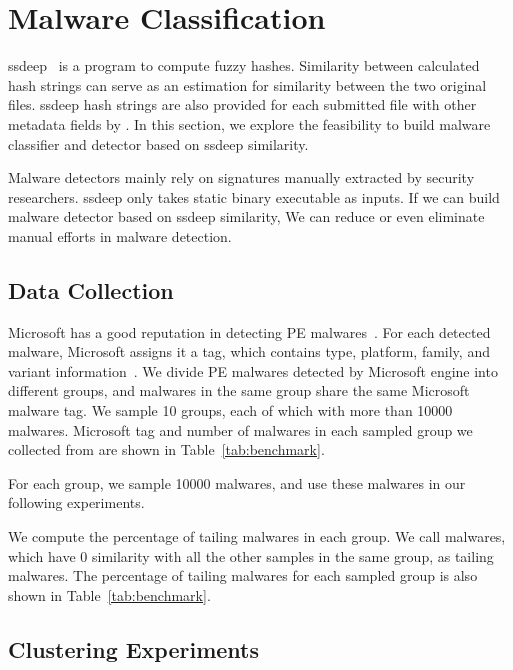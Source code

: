 \section{Malware Classification}
\label{sec:ssdeep}

ssdeep~\cite{ssdeep} is a program to compute fuzzy hashes. 
Similarity between calculated hash strings can serve as an estimation for similarity between the two original files. 
ssdeep hash strings are also provided for each submitted file with other metadata fields by \vt. 
In this section, we explore the feasibility to build malware classifier and detector based on ssdeep similarity. 

Malware detectors mainly rely on signatures manually extracted by security researchers. 
ssdeep only takes static binary executable as inputs. 
If we can build malware detector based on ssdeep similarity, 
We can reduce or even eliminate manual efforts in malware detection. 


\subsection{Data Collection}



Microsoft has a good reputation in detecting PE malwares~\cite{SongAPsys2016}.
For each detected malware, Microsoft assigns it a tag, which contains type, platform, family, and variant information~\cite{microsoft}. 
We divide PE malwares detected by Microsoft engine into different groups, and malwares in the same group share the same Microsoft malware tag. 
We sample 10 groups, each of which with more than 10000 malwares.  
Microsoft tag and number of malwares in each sampled group we collected from \vt{} are shown in Table~\ref{tab:benchmark}. 

For each group, we sample 10000 malwares, and use these malwares in our following experiments. 

We compute the percentage of tailing malwares in each group. 
We call malwares, which have 0 similarity with all the other samples in the same group, as tailing malwares. 
The percentage of tailing malwares for each sampled group is also shown in Table~\ref{tab:benchmark}. 

\subsection{Clustering Experiments}



